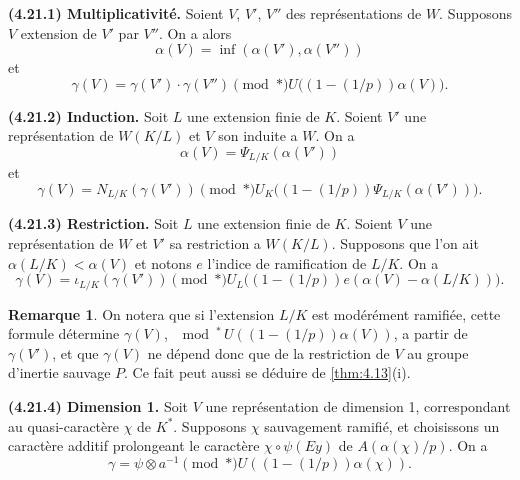 \documentclass[12pt,a4paper]{article}
\theoremstyle{plain}
\theoremstyle{definition}
\newtheorem{remark}[theorem]{Remarque}
\theoremstyle{remark}
\begin{document}
\textbf{(4.21.1) Multiplicativit\'e.} Soient $V$, $V'$, $V''$ des repr\'esentations de $W$. Supposons $V$ extension de $V'$ par $V''$. On a alors
\[
\alpha(V) = \inf(\alpha(V'), \alpha(V''))
\]
et
\[
\gamma(V) = \gamma(V') \cdot \gamma(V'') \pmod{*} U\bigl((1-(1/p))\alpha(V)\bigr).
\]

\textbf{(4.21.2) Induction.} Soit $L$ une extension finie de $K$. Soient $V'$ une repr\'esentation de $W(K/L)$ et $V$ son induite a $W$. On a
\[
\alpha(V) = \Psi_{L/K}(\alpha(V'))
\]
et
\[
\gamma(V) = N_{L/K}(\gamma(V')) \pmod{*} U_K\bigl((1-(1/p))\Psi_{L/K}(\alpha(V'))\bigr).
\]

\textbf{(4.21.3) Restriction.} Soit $L$ une extension finie de $K$. Soient $V$ une repr\'esentation de $W$ et $V'$ sa restriction a $W(K/L)$. Supposons que l'on ait $\alpha(L/K) < \alpha(V)$ et notons $e$ l'indice de ramification de $L/K$. On a
\[
\gamma(V) = \iota_{L/K}(\gamma(V')) \pmod{*} U_L\bigl((1-(1/p))e(\alpha(V) - \alpha(L/K))\bigr).
\]

\begin{remark}
On notera que si l'extension $L/K$ est mod\'er\'ement ramifi\'ee, cette formule d\'etermine $\gamma(V)$, $\mod^*\, U((1-(1/p))\alpha(V))$, a partir de $\gamma(V')$, et que $\gamma(V)$ ne d\'epend donc que de la restriction de $V$ au groupe d'inertie sauvage $P$. Ce fait peut aussi se d\'eduire de \ref{thm:4.13}(i).
\end{remark}

\textbf{(4.21.4) Dimension 1.} Soit $V$ une repr\'esentation de dimension 1, correspondant au quasi-caract\`ere $\chi$ de $K^*$. Supposons $\chi$ sauvagement ramifi\'e, et choisissons un caract\`ere additif prolongeant le caract\`ere $\chi \circ \psi(Ey)$ de $A(\alpha(\chi)/p)$. On a
\[
\gamma = \psi \otimes a^{-1} \pmod{*} U((1-(1/p))\alpha(\chi)).
\]

\subsection{}
\label{sec:4.22}
\end{document}
